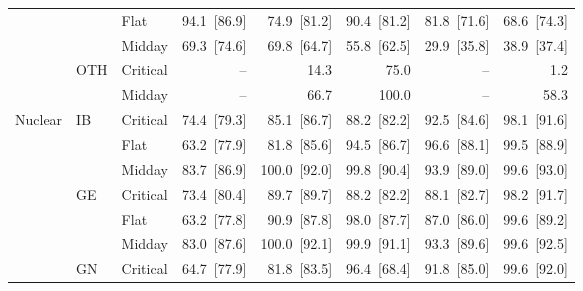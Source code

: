 \begin{tabular}{l l l r r r r r}
 &  & Flat & 94.1~{\color{seasoncol}\scriptsize[86.9]} & 74.9~{\color{seasoncol}\scriptsize[81.2]} & 90.4~{\color{seasoncol}\scriptsize[81.2]} & 81.8~{\color{seasoncol}\scriptsize[71.6]} & 68.6~{\color{seasoncol}\scriptsize[74.3]} \\
 &  & Midday & 69.3~{\color{seasoncol}\scriptsize[74.6]} & 69.8~{\color{seasoncol}\scriptsize[64.7]} & 55.8~{\color{seasoncol}\scriptsize[62.5]} & 29.9~{\color{seasoncol}\scriptsize[35.8]} & 38.9~{\color{seasoncol}\scriptsize[37.4]} \\
 & OTH & Critical & -- & 14.3 & 75.0 & -- & 1.2 \\
 &  & Midday & -- & 66.7 & 100.0 & -- & 58.3 \\
\addlinespace
Nuclear & IB & Critical & 74.4~{\color{seasoncol}\scriptsize[79.3]} & 85.1~{\color{seasoncol}\scriptsize[86.7]} & 88.2~{\color{seasoncol}\scriptsize[82.2]} & 92.5~{\color{seasoncol}\scriptsize[84.6]} & 98.1~{\color{seasoncol}\scriptsize[91.6]} \\
 &  & Flat & 63.2~{\color{seasoncol}\scriptsize[77.9]} & 81.8~{\color{seasoncol}\scriptsize[85.6]} & 94.5~{\color{seasoncol}\scriptsize[86.7]} & 96.6~{\color{seasoncol}\scriptsize[88.1]} & 99.5~{\color{seasoncol}\scriptsize[88.9]} \\
 &  & Midday & 83.7~{\color{seasoncol}\scriptsize[86.9]} & 100.0~{\color{seasoncol}\scriptsize[92.0]} & 99.8~{\color{seasoncol}\scriptsize[90.4]} & 93.9~{\color{seasoncol}\scriptsize[89.0]} & 99.6~{\color{seasoncol}\scriptsize[93.0]} \\
 & GE & Critical & 73.4~{\color{seasoncol}\scriptsize[80.4]} & 89.7~{\color{seasoncol}\scriptsize[89.7]} & 88.2~{\color{seasoncol}\scriptsize[82.2]} & 88.1~{\color{seasoncol}\scriptsize[82.7]} & 98.2~{\color{seasoncol}\scriptsize[91.7]} \\
 &  & Flat & 63.2~{\color{seasoncol}\scriptsize[77.8]} & 90.9~{\color{seasoncol}\scriptsize[87.8]} & 98.0~{\color{seasoncol}\scriptsize[87.7]} & 87.0~{\color{seasoncol}\scriptsize[86.0]} & 99.6~{\color{seasoncol}\scriptsize[89.2]} \\
 &  & Midday & 83.0~{\color{seasoncol}\scriptsize[87.6]} & 100.0~{\color{seasoncol}\scriptsize[92.1]} & 99.9~{\color{seasoncol}\scriptsize[91.1]} & 93.3~{\color{seasoncol}\scriptsize[89.6]} & 99.6~{\color{seasoncol}\scriptsize[92.5]} \\
 & GN & Critical & 64.7~{\color{seasoncol}\scriptsize[77.9]} & 81.8~{\color{seasoncol}\scriptsize[83.5]} & 96.4~{\color{seasoncol}\scriptsize[68.4]} & 91.8~{\color{seasoncol}\scriptsize[85.0]} & 99.6~{\color{seasoncol}\scriptsize[92.0]} \\

\end{tabular}
